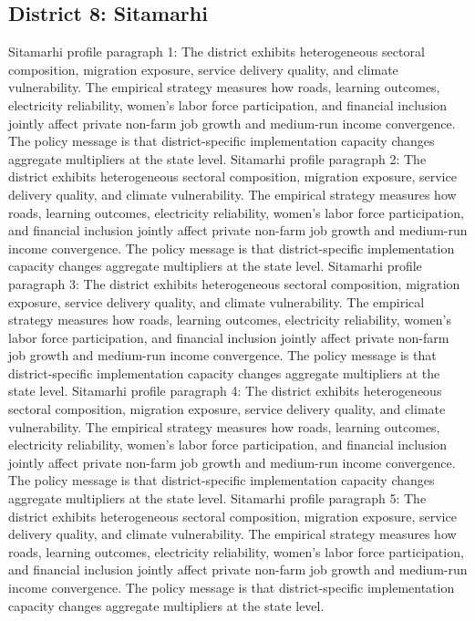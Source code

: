\documentclass[preprint,12pt]{elsarticle}
\begin{document}
\subsection{District 8: Sitamarhi}
Sitamarhi profile paragraph 1: The district exhibits heterogeneous sectoral composition, migration exposure, service delivery quality, and climate vulnerability. The empirical strategy measures how roads, learning outcomes, electricity reliability, women's labor force participation, and financial inclusion jointly affect private non-farm job growth and medium-run income convergence. The policy message is that district-specific implementation capacity changes aggregate multipliers at the state level.
Sitamarhi profile paragraph 2: The district exhibits heterogeneous sectoral composition, migration exposure, service delivery quality, and climate vulnerability. The empirical strategy measures how roads, learning outcomes, electricity reliability, women's labor force participation, and financial inclusion jointly affect private non-farm job growth and medium-run income convergence. The policy message is that district-specific implementation capacity changes aggregate multipliers at the state level.
Sitamarhi profile paragraph 3: The district exhibits heterogeneous sectoral composition, migration exposure, service delivery quality, and climate vulnerability. The empirical strategy measures how roads, learning outcomes, electricity reliability, women's labor force participation, and financial inclusion jointly affect private non-farm job growth and medium-run income convergence. The policy message is that district-specific implementation capacity changes aggregate multipliers at the state level.
Sitamarhi profile paragraph 4: The district exhibits heterogeneous sectoral composition, migration exposure, service delivery quality, and climate vulnerability. The empirical strategy measures how roads, learning outcomes, electricity reliability, women's labor force participation, and financial inclusion jointly affect private non-farm job growth and medium-run income convergence. The policy message is that district-specific implementation capacity changes aggregate multipliers at the state level.
Sitamarhi profile paragraph 5: The district exhibits heterogeneous sectoral composition, migration exposure, service delivery quality, and climate vulnerability. The empirical strategy measures how roads, learning outcomes, electricity reliability, women's labor force participation, and financial inclusion jointly affect private non-farm job growth and medium-run income convergence. The policy message is that district-specific implementation capacity changes aggregate multipliers at the state level.
\end{document}
